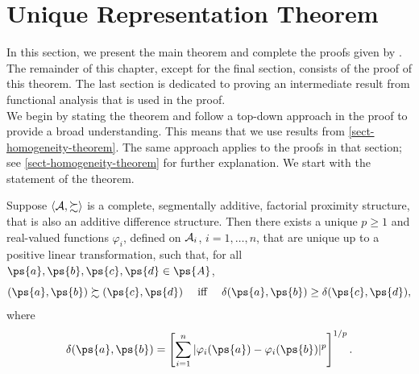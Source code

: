 \section{Unique Representation Theorem} \label{sec-unique-repr-thm}

In this section, we present the main theorem and complete the proofs given by \textcite[pp. 195-199]{foundations2}. The remainder of this chapter, except for the final section, consists of the proof of this theorem. The last section is dedicated to proving an intermediate result from functional analysis that is used in the proof.\\
We begin by stating the theorem and follow a top-down approach in the proof to provide a broad understanding. This means that we use results from \cref{sect-homogeneity-theorem}. The same approach applies to the proofs in that section; see \cref{sect-homogeneity-theorem} for further explanation.
We start with the statement of the theorem.

\begin{thm}\label{thm-uniquene-repr-minkowski} 
	Suppose $\langle \mathcal{A}, \succsim \rangle$ is a complete, segmentally additive, factorial proximity structure, that is also an additive difference structure.
	Then there exists a unique $p \geq 1$ and real-valued functions $\varphi_i$, defined on $\mathcal{A}_i$, $i = 1, \ldots, n$, that are unique up to a positive linear transformation, such that, for all $\ps{a}, \ps{b}, \ps{c}, \ps{d} \in \ps{A}$,
	$$(\ps{a}, \ps{b}) \succsim (\ps{c}, \ps{d}) \quad  \text{ iff } \quad  \delta(\ps{a}, \ps{b}) \geq \delta(\ps{c}, \ps{d}),$$
	where
	$$\delta(\ps{a}, \ps{b}) = \left[\sum_{i=1}^{n} |\varphi_i(\ps{a}) - \varphi_i(\ps{b})|^p\right]^{1/p}.$$
\end{thm}

\newcommand\ta{x}

